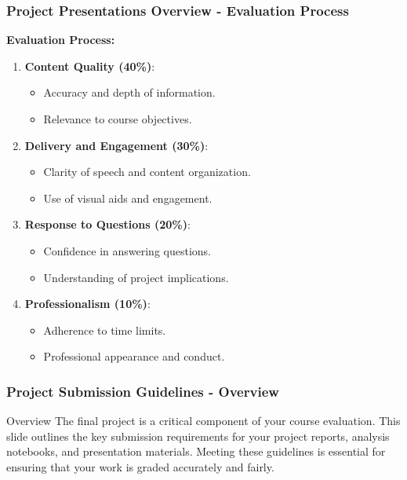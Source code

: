 \documentclass[aspectratio=169]{beamer}
\begin{document}
\begin{frame}[fragile]
    \frametitle{Project Presentations Overview - Evaluation Process}
    \textbf{Evaluation Process:}
    \begin{enumerate}
        \item \textbf{Content Quality (40\%)}:
        \begin{itemize}
            \item Accuracy and depth of information.
            \item Relevance to course objectives.
        \end{itemize}
        \item \textbf{Delivery and Engagement (30\%)}:
        \begin{itemize}
            \item Clarity of speech and content organization.
            \item Use of visual aids and engagement.
        \end{itemize}
        \item \textbf{Response to Questions (20\%)}:
        \begin{itemize}
            \item Confidence in answering questions.
            \item Understanding of project implications.
        \end{itemize}
        \item \textbf{Professionalism (10\%)}:
        \begin{itemize}
            \item Adherence to time limits.
            \item Professional appearance and conduct.
        \end{itemize}
    \end{enumerate}
\end{frame}

\begin{frame}[fragile]
    \frametitle{Project Submission Guidelines - Overview}
    \begin{block}{Overview}
        The final project is a critical component of your course evaluation. This slide outlines the key submission 
        requirements for your project reports, analysis notebooks, and presentation materials. Meeting these 
        guidelines is essential for ensuring that your work is graded accurately and fairly.
    \end{block}
\end{frame}
\end{document}
